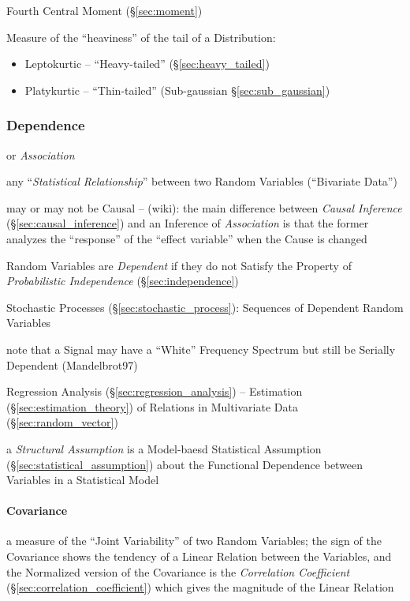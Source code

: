 Fourth Central Moment (\S\ref{sec:moment})

Measure of the ``heaviness'' of the tail of a Distribution:

\begin{itemize}
  \item Leptokurtic -- ``Heavy-tailed'' (\S\ref{sec:heavy_tailed})
  \item Platykurtic -- ``Thin-tailed'' (Sub-gaussian \S\ref{sec:sub_gaussian})
\end{itemize}



\subsubsection{Dependence}\label{sec:dependence}

or \emph{Association}

any ``\emph{Statistical Relationship}'' between two Random Variables
(``Bivariate Data'')

may or may not be Causal -- (wiki): the main difference between
\emph{Causal Inference} (\S\ref{sec:causal_inference}) and an Inference of
\emph{Association} is that the former analyzes the ``response'' of the ``effect
variable'' when the Cause is changed

Random Variables are \emph{Dependent} if they do not Satisfy the Property of
\emph{Probabilistic Independence} (\S\ref{sec:independence})

Stochastic Processes (\S\ref{sec:stochastic_process}): Sequences of Dependent
Random Variables

note that a Signal may have a ``White'' Frequency Spectrum but still be Serially
Dependent (Mandelbrot97)

\fist Regression Analysis (\S\ref{sec:regression_analysis}) -- Estimation
(\S\ref{sec:estimation_theory}) of Relations in Multivariate Data
(\S\ref{sec:random_vector})

\fist a \emph{Structural Assumption} is a Model-baesd Statistical Assumption
(\S\ref{sec:statistical_assumption}) about the Functional Dependence between
Variables in a Statistical Model



\paragraph{Covariance}\label{sec:covariance}\hfill

a measure of the ``Joint Variability'' of two Random Variables; the sign of the
Covariance shows the tendency of a Linear Relation between the Variables, and
the Normalized version of the Covariance is the \emph{Correlation Coefficient}
(\S\ref{sec:correlation_coefficient}) which gives the magnitude of the Linear
Relation

